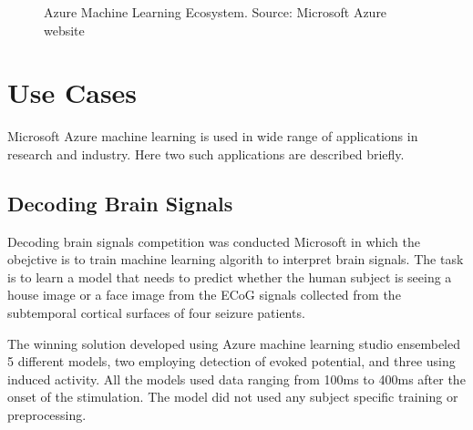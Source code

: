 \documentclass[9pt,twocolumn,twoside]{styles/osajnl}
\begin{document}
\begin{figure}[htbp]
\centering
{}
\caption{Azure Machine Learning Ecosystem. \newline Source: Microsoft
  Azure website\cite{www-azureSQLDataWarehouse}}
\label{fig:false-color}
\end{figure}

\section{Use Cases}
Microsoft Azure machine learning is used in wide range of applications
in research and industry. Here two such applications are described
briefly.

\subsection{Decoding Brain Signals}
Decoding brain signals competition\cite{www-cortanaDecodeBrainSignal}
was conducted Microsoft in which the obejctive is to train machine
learning algorith to interpret brain signals. The task is to learn a
model that needs to predict whether the human subject is seeing a
house image or a face image from the ECoG signals collected from the
subtemporal cortical surfaces of four seizure patients.

The winning solution developed using Azure machine learning studio
ensembeled 5 different models, two employing detection of evoked
potential, and three using induced activity. All the models used data
ranging from 100ms to 400ms after the onset of the stimulation. The
model did not used any subject specific training or preprocessing.
\end{document}
